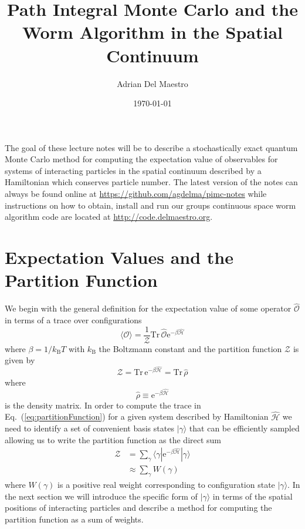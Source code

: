 \documentclass[prb,aps,amssym,nofootinbib,floatfix,notitlepage]{revtex4-1}
\newcommand{\e}[1]{\mathrm{e}^{#1}}
\renewcommand{\eqref}[1]{Eq.~(\ref{#1})}
\begin{document}
\title{Path Integral Monte Carlo and the Worm Algorithm in the Spatial
Continuum}
\author{Adrian Del Maestro}

\date{\today}
\maketitle

The goal of these lecture notes will be to describe a stochastically exact
quantum Monte Carlo method for computing the expectation value of observables
for systems of interacting particles in the spatial continuum described by a
Hamiltonian  which conserves particle number.  The latest
version of the notes can always be found online at
\url{https://github.com/agdelma/pimc-notes} while instructions on how to
obtain, install and run our groups continuous space worm algorithm code are located at
\url{http://code.delmaestro.org}.

\section{Expectation Values and the Partition Function}

We begin with the general definition for the expectation value of some operator
$\hat{\mathcal{O}}$ in terms of a trace over configurations
%
\begin{equation}
    \langle \mathcal{O} \rangle = \frac{1}{\mathcal{Z}} \mathrm{Tr}\, 
    \hat{\mathcal{O}}\e{-\beta \hat{\mathcal{H}}} 
\label{eq:operatorExpectationValue}
\end{equation}
%
where $\beta = 1/k_{\mathrm{B}}T$ with $k_{\mathrm{B}}$ the Boltzmann constant
and the partition function $\mathcal{Z}$ is given by
%
\begin{equation}
    \mathcal{Z} = \mathrm{Tr}\,\e{-\beta \hat{\mathcal{H}}} 
    = \mathrm{Tr}\,\hat{\rho} 
\label{eq:partitionFunction} 
\end{equation}
%
where 
%
\begin{equation}
\hat{\rho} \equiv \e{-\beta \hat{\mathcal{H}}} 
\end{equation}
%
is the density matrix.  In order to compute the trace in
\eqref{eq:partitionFunction} for a given system described by Hamiltonian
$\hat{\mathcal{H}}$ we need to identify a set of convenient basis states
$|\gamma\rangle$ that can be efficiently sampled allowing us to write the
partition function as the direct sum 
%
\begin{align}
    \mathcal{Z} &=  \sum_{\gamma}\langle \gamma | \e{-\beta \hat{\mathcal{H}}}
    |\gamma \rangle \nonumber \\
    &\approx \sum_{\gamma} W(\gamma)
\end{align}
%
where $W(\gamma)$ is a positive real weight corresponding to configuration
state $|\gamma\rangle$.  In the next section we will introduce the specific
form of $|\gamma\rangle$ in terms of the spatial positions of interacting
particles and describe a method for computing the partition function as a sum
of weights.
\end{document}
